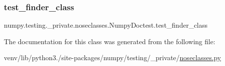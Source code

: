 \subsubsection{\texorpdfstring{test\+\_\+finder\+\_\+class}{test\_finder\_class}}
{\footnotesize\ttfamily numpy.\+testing.\+\_\+private.\+noseclasses.\+Numpy\+Doctest.\+test\+\_\+finder\+\_\+class\hspace{0.3cm}{\ttfamily [static]}}



The documentation for this class was generated from the following file\+:\begin{DoxyCompactItemize}
\item 
venv/lib/python3./site-\/packages/numpy/testing/\+\_\+private/\hyperlink{noseclasses_8py}{noseclasses.\+py}\end{DoxyCompactItemize}
